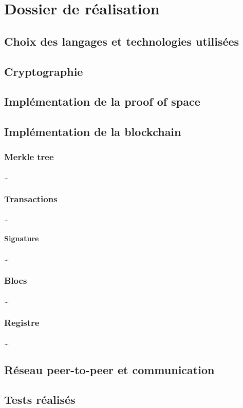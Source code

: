 \chapter{Dossier de réalisation}
\label{ch:realisation}

\section{Choix des langages et technologies utilisées}

\lipsum[1]

\section{Cryptographie}

\lipsum[2]

\section{Implémentation de la proof of space}

\lipsum[3]

\section{Implémentation de la blockchain}

\lipsum[4]

\subsection{Merkle tree}

\dots

\subsection{Transactions}

\dots

\subsubsection{Signature}

\dots

\subsection{Blocs}

\dots

\subsection{Registre}

\dots

\section{Réseau peer-to-peer et communication}

\lipsum[5]

\section{Tests réalisés}

\lipsum[6]